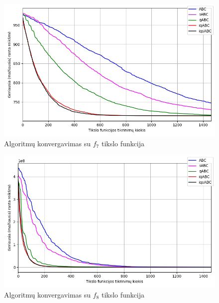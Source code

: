 \documentclass{VUMIFKompMagistrinis}
\begin{document}
\begin{landscape}
\begin{multicols}{2}
\begin{figure}[H]
    \centering
    \includegraphics[scale=0.45]{img/2kv/all_f7.jpg}
    \caption{Algoritmų konvergavimas su $f_{7}$ tikslo funkcija}
    \label{img:konf7}
\end{figure}


\begin{figure}[H]
    \centering
    \includegraphics[scale=0.45]{img/2kv/all_f8.jpg}
    \caption{Algoritmų konvergavimas su $f_{8}$ tikslo funkcija}
    \label{img:konf8}
\end{figure}





\end{multicols}
\begin{multicols}{2}


\end{multicols}
\end{landscape}
\end{document}
